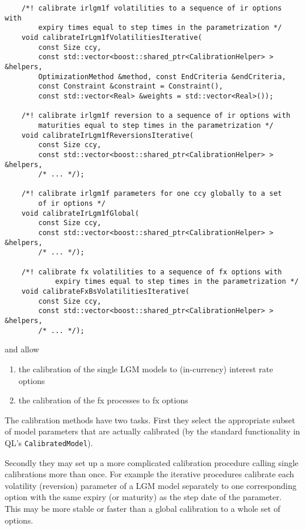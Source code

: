 \documentclass[12pt, a4paper]{article}
\begin{document}
\medskip
\scriptsize
\begin{verbatim}
    /*! calibrate irlgm1f volatilities to a sequence of ir options with
        expiry times equal to step times in the parametrization */
    void calibrateIrLgm1fVolatilitiesIterative(
        const Size ccy,
        const std::vector<boost::shared_ptr<CalibrationHelper> > &helpers,
        OptimizationMethod &method, const EndCriteria &endCriteria,
        const Constraint &constraint = Constraint(),
        const std::vector<Real> &weights = std::vector<Real>());

    /*! calibrate irlgm1f reversion to a sequence of ir options with
        maturities equal to step times in the parametrization */
    void calibrateIrLgm1fReversionsIterative(
        const Size ccy,
        const std::vector<boost::shared_ptr<CalibrationHelper> > &helpers,
        /* ... */);

    /*! calibrate irlgm1f parameters for one ccy globally to a set
        of ir options */
    void calibrateIrLgm1fGlobal(
        const Size ccy,
        const std::vector<boost::shared_ptr<CalibrationHelper> > &helpers,
        /* ... */);

    /*! calibrate fx volatilities to a sequence of fx options with
            expiry times equal to step times in the parametrization */
    void calibrateFxBsVolatilitiesIterative(
        const Size ccy,
        const std::vector<boost::shared_ptr<CalibrationHelper> > &helpers,
        /* ... */);
\end{verbatim}
\normalsize
\medskip

and allow

\begin{enumerate}
\item the calibration of the single LGM models to (in-currency) interest rate options
\item the calibration of the fx processes to fx options
\end{enumerate}

The calibration methods have two tasks. First they select the appropriate subset of model parameters that are actually calibrated (by the standard functionality in QL's \verb+CalibratedModel+).

Secondly they may set up a more complicated calibration procedure calling single calibrations more than once. For example the iterative procedures calibrate each volatility (reversion) parameter of a LGM model separately to one corresponding option with the same expiry (or maturity) as the step date of the parameter. This may be more stable or faster than a global calibration to a whole set of options.
\end{document}
